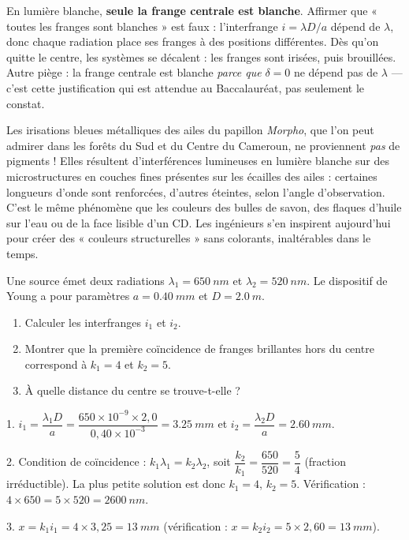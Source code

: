 \documentclass[11pt]{article}
\begin{document}
\begin{attention}
En lumière blanche, \textbf{seule la frange centrale est blanche}. Affirmer que « toutes les franges sont blanches » est faux : l'interfrange $i = \lambda D/a$ dépend de $\lambda$, donc chaque radiation place ses franges à des positions différentes. Dès qu'on quitte le centre, les systèmes se décalent : les franges sont irisées, puis brouillées. Autre piège : la frange centrale est blanche \emph{parce que} $\delta = 0$ ne dépend pas de $\lambda$ — c'est cette justification qui est attendue au Baccalauréat, pas seulement le constat.
\end{attention}

\begin{savaistu}
Les irisations bleues métalliques des ailes du papillon \emph{Morpho}, que l'on peut admirer dans les forêts du Sud et du Centre du Cameroun, ne proviennent \emph{pas} de pigments ! Elles résultent d'interférences lumineuses en lumière blanche sur des microstructures en couches fines présentes sur les écailles des ailes : certaines longueurs d'onde sont renforcées, d'autres éteintes, selon l'angle d'observation. C'est le même phénomène que les couleurs des bulles de savon, des flaques d'huile sur l'eau ou de la face lisible d'un CD. Les ingénieurs s'en inspirent aujourd'hui pour créer des « couleurs structurelles » sans colorants, inaltérables dans le temps.
\end{savaistu}

\begin{exercice}
Une source émet deux radiations $\lambda_1 = \SI{650}{nm}$ et $\lambda_2 = \SI{520}{nm}$. Le dispositif de Young a pour paramètres $a = \SI{0,40}{mm}$ et $D = \SI{2,0}{m}$.
\begin{enumerate}
\item Calculer les interfranges $i_1$ et $i_2$.
\item Montrer que la première coïncidence de franges brillantes hors du centre correspond à $k_1 = 4$ et $k_2 = 5$.
\item À quelle distance du centre se trouve-t-elle ?
\end{enumerate}
\end{exercice}

\begin{corrige}
1. $i_1 = \dfrac{\lambda_1 D}{a} = \dfrac{650\times 10^{-9}\times 2{,}0}{0{,}40\times 10^{-3}} = \SI{3,25}{mm}$ et $i_2 = \dfrac{\lambda_2 D}{a} = \SI{2,60}{mm}$.

2. Condition de coïncidence : $k_1\lambda_1 = k_2\lambda_2$, soit $\dfrac{k_2}{k_1} = \dfrac{650}{520} = \dfrac{5}{4}$ (fraction irréductible). La plus petite solution est donc $k_1 = 4$, $k_2 = 5$. Vérification : $4 \times 650 = 5 \times 520 = \SI{2600}{nm}$.

3. $x = k_1 i_1 = 4 \times 3{,}25 = \SI{13}{mm}$ (vérification : $x = k_2 i_2 = 5 \times 2{,}60 = \SI{13}{mm}$).
\end{corrige}
\end{document}

